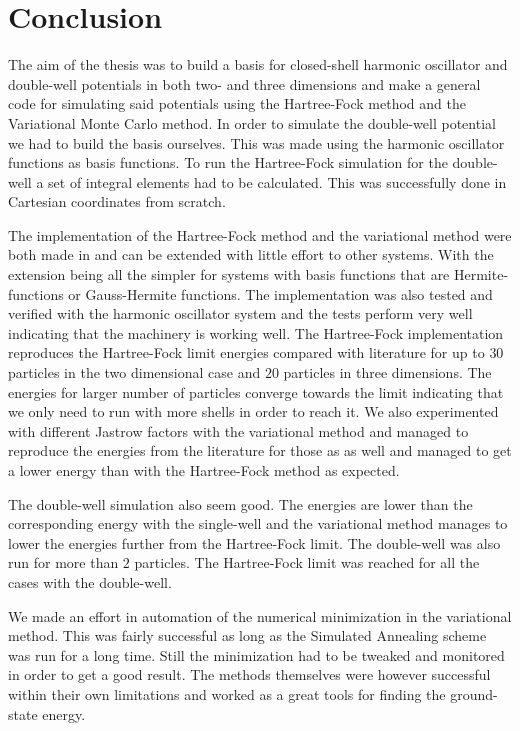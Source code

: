 \chapter{Conclusion \label{chapter:7}}
    The aim of the thesis was to build a basis for closed-shell harmonic
    oscillator and double-well potentials in both two- and three dimensions and
    make a general code for simulating said potentials using the Hartree-Fock
    method and the Variational Monte Carlo method. In order to simulate the
    double-well potential we had to build the basis ourselves. This was made
    using the harmonic oscillator functions as basis functions. To run the
    Hartree-Fock simulation for the double-well a set of integral elements had
    to be calculated. This was successfully done in Cartesian coordinates from
    scratch.

    The implementation of the Hartree-Fock method and the variational method
    were both made in \CC and can be extended with little effort to other
    systems. With the extension being all the simpler for systems with basis
    functions that are Hermite-functions or Gauss-Hermite functions. The
    implementation was also tested and verified with the harmonic oscillator
    system and the tests perform very well indicating that the machinery is
    working well. The Hartree-Fock implementation reproduces the Hartree-Fock
    limit energies compared with literature for up to $30$ particles in the two
    dimensional case and $20$ particles in three dimensions. The energies for
    larger number of particles converge towards the limit indicating that we
    only need to run with more shells in order to reach it.  We also
    experimented with different Jastrow factors with the variational method and
    managed to reproduce the energies from the literature for those as as well
    and managed to get a lower energy than with the Hartree-Fock method as
    expected.

    The double-well simulation also seem good. The energies are lower than the
    corresponding energy with the single-well and the variational method
    manages to lower the energies further from the Hartree-Fock limit. The
    double-well was also run for more than $2$ particles. The Hartree-Fock
    limit was reached for all the cases with the double-well.

    We made an effort in automation of the numerical minimization in the
    variational method. This was fairly successful as long as the Simulated
    Annealing scheme was run for a long time. Still the minimization had to be
    tweaked and monitored in order to get a good result. The methods themselves
    were however successful within their own limitations and worked as a great
    tools for finding the ground-state energy.

